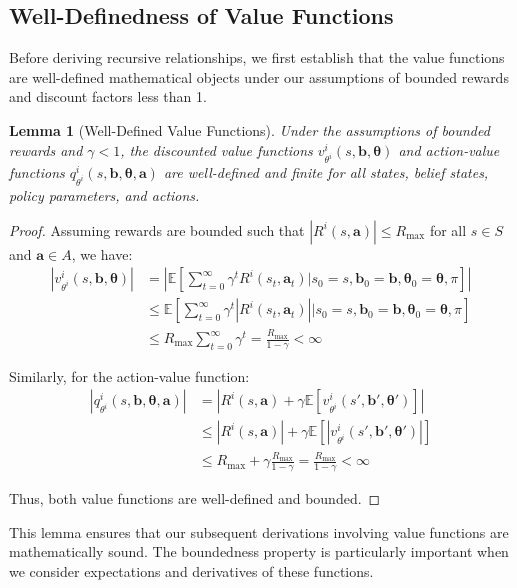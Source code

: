 \documentclass[a4paper,12pt]{report}
\newtheorem{lemma}{Lemma}
\begin{document}
\subsection{Well-Definedness of Value Functions}
Before deriving recursive relationships, we first establish that the value functions
are well-defined mathematical objects under our assumptions of bounded rewards and
discount factors less than 1.
\begin{lemma}[Well-Defined Value Functions]
    Under the assumptions of bounded rewards and $\gamma < 1$, the discounted
    value functions $v^{i}_{\theta^i}(s, \boldsymbol{b}, \boldsymbol{\theta})$ and
    action-value functions
    $q^{i}_{\theta^i}(s, \boldsymbol{b}, \boldsymbol{\theta}, \boldsymbol{a})$ are
    well-defined and finite for all states, belief states, policy parameters, and actions.
\end{lemma}
\begin{proof}
    Assuming rewards are bounded such that $|R^{i}(s, \boldsymbol{a})| \leq R_{\max}$
    for all $s \in S$ and $\boldsymbol{a}\in A$, we have:
    \begin{align}
        |v^{i}_{\theta^i}(s, \boldsymbol{b}, \boldsymbol{\theta})| & = \left| \mathbb{E}\left[ \sum_{t=0}^{\infty}\gamma^{t} R^{i}(s_{t}, \boldsymbol{a}_{t}) \bigg| s_{0}=s, \boldsymbol{b}_{0}=\boldsymbol{b}, \boldsymbol{\theta}_{0}=\boldsymbol{\theta}, \pi \right] \right| \\
                                                                   & \leq \mathbb{E}\left[ \sum_{t=0}^{\infty}\gamma^{t} |R^{i}(s_{t}, \boldsymbol{a}_{t})| \bigg| s_{0}=s, \boldsymbol{b}_{0}=\boldsymbol{b}, \boldsymbol{\theta}_{0}=\boldsymbol{\theta}, \pi \right]           \\
                                                                   & \leq R_{\max}\sum_{t=0}^{\infty}\gamma^{t} = \frac{R_{\max}}{1-\gamma}< \infty
    \end{align}

    Similarly, for the action-value function:
    \begin{align}
        |q^{i}_{\theta^i}(s, \boldsymbol{b}, \boldsymbol{\theta}, \boldsymbol{a})| & = \left| R^{i}(s, \boldsymbol{a}) + \gamma \mathbb{E}[v^{i}_{\theta^i}(s', \boldsymbol{b}', \boldsymbol{\theta}')] \right| \\
                                                                                   & \leq |R^{i}(s, \boldsymbol{a})| + \gamma \mathbb{E}[|v^{i}_{\theta^i}(s', \boldsymbol{b}', \boldsymbol{\theta}')|]         \\
                                                                                   & \leq R_{\max}+ \gamma \frac{R_{\max}}{1-\gamma}= \frac{R_{\max}}{1-\gamma}< \infty
    \end{align}

    Thus, both value functions are well-defined and bounded.
\end{proof}This lemma ensures that our subsequent derivations involving value
functions are mathematically sound. The boundedness property is particularly important
when we consider expectations and derivatives of these functions.
\end{document}
